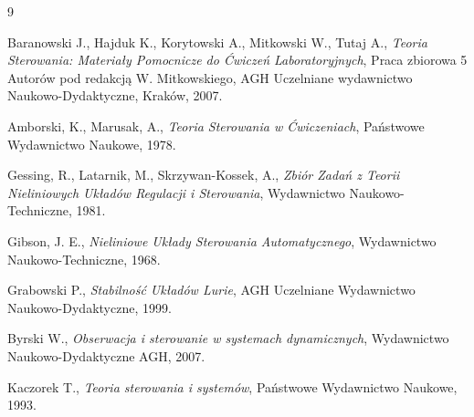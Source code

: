 \documentclass{article}
\begin{document}
\newpage
\begin{thebibliography}{9}

  Baranowski J., Hajduk K., Korytowski A., Mitkowski W., Tutaj A.,
  \emph{Teoria Sterowania: Materiały Pomocnicze do Ćwiczeń Laboratoryjnych},
  Praca zbiorowa 5 Autorów pod redakcją W. Mitkowskiego,
  AGH Uczelniane wydawnictwo Naukowo-Dydaktyczne,
  Kraków, 2007.

  Amborski, K., Marusak, A.,
  \emph{Teoria Sterowania w Ćwiczeniach},
  Państwowe Wydawnictwo Naukowe,
  1978.

  Gessing, R., Latarnik, M., Skrzywan-Kossek, A.,
  \emph{Zbiór Zadań z Teorii Nieliniowych Układów Regulacji i Sterowania},
  Wydawnictwo Naukowo-Techniczne,
  1981.

  Gibson, J. E.,
  \emph{Nieliniowe Układy Sterowania Automatycznego},
  Wydawnictwo Naukowo-Techniczne,
  1968.

  Grabowski P.,
  \emph{Stabilność Układów Lurie},
  AGH Uczelniane Wydawnictwo Naukowo-Dydaktyczne,
  1999.

  Byrski W.,
  \emph{Obserwacja i sterowanie w systemach dynamicznych},
  Wydawnictwo Naukowo-Dydaktyczne AGH,
  2007.

  Kaczorek T.,
  \emph{Teoria sterowania i systemów},
  Państwowe Wydawnictwo Naukowe,
  1993.

\end{thebibliography}
\end{document}

